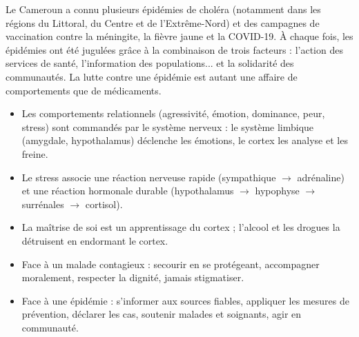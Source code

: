 \documentclass[11pt]{article}
\begin{document}
\begin{savaistu}
Le Cameroun a connu plusieurs épidémies de choléra (notamment dans les régions du Littoral, du Centre et de l'Extrême-Nord) et des campagnes de vaccination contre la méningite, la fièvre jaune et la COVID-19. À chaque fois, les épidémies ont été jugulées grâce à la combinaison de trois facteurs : l'action des services de santé, l'information des populations... et la solidarité des communautés. La lutte contre une épidémie est autant une affaire de comportements que de médicaments.
\end{savaistu}

\begin{aretenir}
\begin{itemize}
\item Les comportements relationnels (agressivité, émotion, dominance, peur, stress) sont commandés par le système nerveux : le système limbique (amygdale, hypothalamus) déclenche les émotions, le cortex les analyse et les freine.
\item Le stress associe une réaction nerveuse rapide (sympathique $\rightarrow$ adrénaline) et une réaction hormonale durable (hypothalamus $\rightarrow$ hypophyse $\rightarrow$ surrénales $\rightarrow$ cortisol).
\item La maîtrise de soi est un apprentissage du cortex ; l'alcool et les drogues la détruisent en endormant le cortex.
\item Face à un malade contagieux : secourir en se protégeant, accompagner moralement, respecter la dignité, jamais stigmatiser.
\item Face à une épidémie : s'informer aux sources fiables, appliquer les mesures de prévention, déclarer les cas, soutenir malades et soignants, agir en communauté.
\end{itemize}
\end{aretenir}
\end{document}
